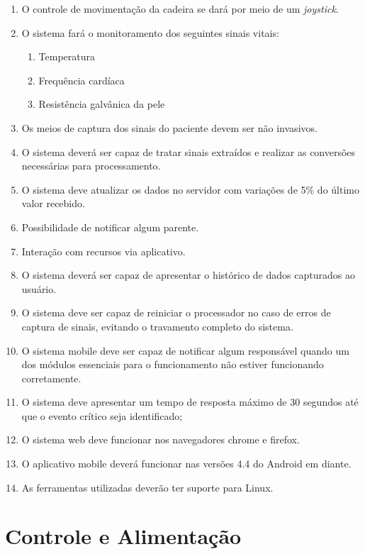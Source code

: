 \begin{enumerate}[resume*]
  \item O controle de movimentação da cadeira se dará por meio de um \textit{joystick}.
  \item O sistema fará o monitoramento dos seguintes sinais vitais:
    \begin{enumerate}[resume*]
      \item Temperatura
      \item Frequência cardíaca
      \item Resistência galvânica da pele
    \end{enumerate}
  \item Os meios de captura dos sinais do paciente devem ser não invasivos.
  \item O sistema deverá ser capaz de tratar sinais extraídos e realizar as
    conversões necessárias para processamento.
  \item O sistema deve atualizar os dados no servidor com variações de 5\% do
    último valor recebido.
  \item Possibilidade de notificar algum parente.
  \item Interação com recursos via aplicativo.
  \item O sistema deverá ser capaz de apresentar o histórico de dados
    capturados ao usuário.
  \item O sistema deve ser capaz de reiniciar o processador no caso de erros de
    captura de sinais, evitando o travamento completo do sistema.
  \item O sistema mobile deve ser capaz de notificar algum responsável quando
    um dos módulos essenciais para o funcionamento não estiver funcionando corretamente.
  \item O sistema deve apresentar um tempo de resposta máximo de 30 segundos
    até que o evento crítico seja identificado;
  \item O sistema web deve funcionar nos navegadores chrome e firefox.
  \item O aplicativo mobile deverá funcionar nas versões 4.4 do Android em diante.
  \item As ferramentas utilizadas deverão ter suporte para Linux.
\end{enumerate}

\section{Controle e Alimentação}

